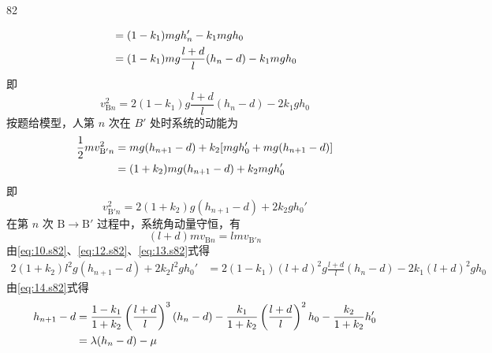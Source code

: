 \begin{solution}{82}
\begin{subsolution}
\begin{subsubsolution}
\begin{subsubsubsolution}
\begin{subsubsubsubsolution}
\begin{align}
                        &= (1-k_{1}) m g h_{n}' - k_{1} m g h_{0} \notag\\
                        &= (1-k_{1}) m g \frac{l+d}{l} (h_{n}-d) - k_{1} m g h_{0}
                        \label{eq:9.s82}
                    \end{align}
                    即
                    \begin{equation}
                        v_{\mathrm{B}n}^{2} = 2(1-k_{1}) g \frac{l+d}{l} (h_{n}-d) - 2 k_{1} g h_{0}
                        \label{eq:10.s82}
                    \end{equation}
                    按题给模型，人第 $n$ 次在 $B'$ 处时系统的动能为
                    \begin{align}
                        \frac{1}{2} m v_{\mathrm{B}'n}^{2} &= m g (h_{n+1}-d) + k_{2}[ m g h_{0}' + m g (h_{n+1}-d) ] \notag\\
                        &= (1+k_{2}) m g (h_{n+1}-d) + k_{2} m g h_{0}'
                        \label{eq:11.s82}
                    \end{align}
                    即
                    \begin{equation}
                        v_{\mathrm{B}'n}^{2} = 2(1+k_{2}) g (h_{n+1}-d) + 2 k_{2} g h_{0}'
                        \label{eq:12.s82}
                    \end{equation}
                    在第 $n$ 次 $\mathrm{B}\rightarrow\mathrm{B}'$ 过程中，系统角动量守恒，有
                    \begin{equation}
                        (l+d) m v_{\mathrm{B}n} = l m v_{\mathrm{B}'n}
                        \label{eq:13.s82}
                    \end{equation}
                    由\eqref{eq:10.s82}、\eqref{eq:12.s82}、\eqref{eq:13.s82}式得
                    \begin{align}
                        2(1+k_{2}) l^{2} g (h_{n+1}-d) + 2 k_{2} l^{2} g h_{0}' &= 2(1-k_{1}) (l+d)^{2} g \frac{l+d}{l} (h_{n}-d) - 2 k_{1} (l+d)^{2} g h_{0}
                        \label{eq:14.s82}
                    \end{align}
                    由\eqref{eq:14.s82}式得
                    \begin{align}
                        h_{n+1} - d &= \frac{1-k_{1}}{1+k_{2}} \left(\frac{l+d}{l}\right)^{3} (h_{n}-d) - \frac{k_{1}}{1+k_{2}} \left(\frac{l+d}{l}\right)^{2} h_{0} - \frac{k_{2}}{1+k_{2}} h_{0}' \notag\\
                        &= \lambda (h_{n}-d) - \mu

\end{align}
\end{subsubsubsubsolution}
\end{subsubsubsolution}
\end{subsubsolution}
\end{subsolution}
\end{solution}
